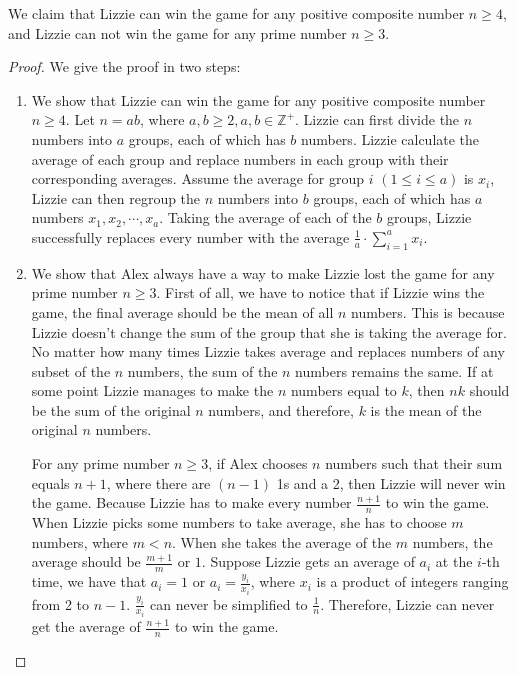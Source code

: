 \documentclass[11pt, oneside]{article}   	%
\begin{document}
We claim that Lizzie can win the game for any positive composite number $n\ge 4$, and Lizzie can not win the game for any prime number $n\ge 3$.
\begin{proof}
We give the proof in two steps:
\begin{enumerate}
\item We show that Lizzie can win the game for any positive composite number $n\ge 4$. Let $n=ab$, where $ a, b\ge 2, a, b\in \mathbb{Z^+}$. Lizzie can first divide the $n$ numbers into $a$ groups, each of which has $b$ numbers. Lizzie calculate the average of each group and replace numbers in each group with their corresponding averages. Assume the average for group $i$ $(1\le i \le a)$ is $x_i$, Lizzie can then regroup the $n$ numbers into $b$ groups, each of which has $a$ numbers $x_1, x_2,\cdots, x_a$. Taking the average of each of the $b$ groups, Lizzie successfully replaces every number with the average $\frac{1}{a}\cdot\sum^a_{i=1} x_i$.

\item We show that Alex always have a way to make Lizzie lost the game for any prime number $n\ge 3$. First of all, we have to notice that if Lizzie wins the game, the final average should be the mean of all $n$ numbers. This is because Lizzie doesn't change the sum of the group that she is taking the average for. No matter how many times Lizzie takes average and replaces numbers of any subset of the $n$ numbers, the sum of the $n$ numbers remains the same. If at some point Lizzie manages to make the $n$ numbers equal to $k$, then $nk$ should be the sum of the original $n$ numbers, and therefore, $k$ is the mean of the original $n$ numbers.

For any prime number $n\ge 3$, if Alex chooses $n$ numbers such that their sum equals $n+1$, where there are $(n-1)$ 1s and a 2,  then Lizzie will never win the game. Because Lizzie has to make every number $\frac{n+1}{n}$ to win the game. When Lizzie picks some numbers to take average, she has to choose $m$ numbers, where $m<n$. When she takes the average of the $m$ numbers, the average should be $\frac{m+1}{m}$ or $1$.  Suppose Lizzie gets an average of $a_i$ at the $i$-th time, we have that $a_i=1$ or $a_i=\frac{y_i}{x_i}$, where $x_i$ is a product of integers ranging from 2 to $n-1$. $\frac{y_i}{x_i}$ can never be simplified to $\frac{1}{n}$. Therefore, Lizzie can never get the average of $\frac{n+1}{n}$ to win the game.
\end{enumerate}

\end{proof}
\end{document}
